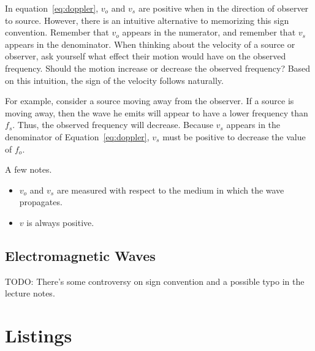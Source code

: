 \documentclass{hw}
\numberwithin{equation}{section}
\begin{document}
In equation~\eqref{eq:doppler}, $v_o$ and $v_s$ are positive when in the
direction of observer to source. However, there is an intuitive alternative to
memorizing this sign convention. Remember that $v_o$ appears in the numerator,
and remember that $v_s$ appears in the denominator. When thinking about the
velocity of a source or observer, ask yourself what effect their motion would
have on the observed frequency. Should the motion increase or decrease the
observed frequency? Based on this intuition, the sign of the velocity follows
naturally.

For example, consider a source moving away from the observer. If a source is
moving away, then the wave he emits will appear to have a lower frequency than
$f_s$. Thus, the observed frequency will decrease. Because $v_s$ appears in the
denominator of Equation~\eqref{eq:doppler}, $v_s$ must be positive to decrease
the value of $f_o$.

A few notes.
\begin{itemize}
  \item $v_o$ and $v_s$ are measured with respect to the medium in which the
    wave propagates.
  \item $v$ is always positive.
\end{itemize}

\subsection{Electromagnetic Waves}
TODO: There's some controversy on sign convention and a possible typo in the
lecture notes.

\section{Listings}
\end{document}
